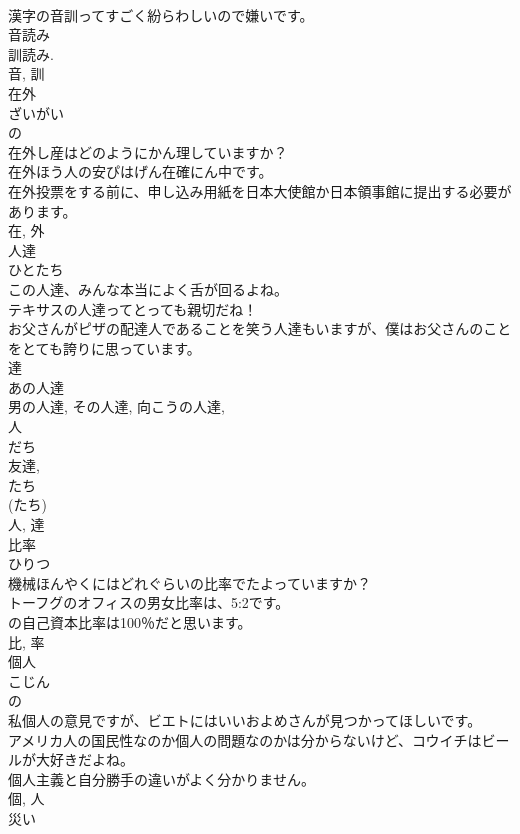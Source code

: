 \documentclass[8pt]{extreport}
\begin{document}
\begin{CJK}{UTF8}{min}
\\	漢字の音訓ってすごく紛らわしいので嫌いです。	
\\	音読み 
\\	訓読み. 
\\	音, 訓	
\\	在外	
\\	ざいがい	
\\	の 
\\	在外し産はどのようにかん理していますか？	
\\	在外ほう人の安ぴはげん在確にん中です。	
\\	在外投票をする前に、申し込み用紙を日本大使館か日本領事館に提出する必要があります。	
\\	在, 外	
\\	人達	
\\	ひとたち	
\\	この人達、みんな本当によく舌が回るよね。	
\\	テキサスの人達ってとっても親切だね！	
\\	お父さんがピザの配達人であることを笑う人達もいますが、僕はお父さんのことをとても誇りに思っています。	
\\	達 
\\	あの人達 
\\	男の人達, その人達, 向こうの人達, 
\\	人 
\\	だち 
\\	友達, 
\\	たち 
\\	(たち) 
\\	人, 達	
\\	比率	
\\	ひりつ	
\\	機械ほんやくにはどれぐらいの比率でたよっていますか？	
\\	トーフグのオフィスの男女比率は、5:2です。	
\\	の自己資本比率は100％だと思います。	
\\	比, 率	
\\	個人	
\\	こじん	
\\	の 
\\	私個人の意見ですが、ビエトにはいいおよめさんが見つかってほしいです。	
\\	アメリカ人の国民性なのか個人の問題なのかは分からないけど、コウイチはビールが大好きだよね。	
\\	個人主義と自分勝手の違いがよく分かりません。	
\\	個, 人	
\\	災い	

\end{CJK}
\end{document}
